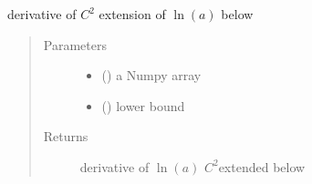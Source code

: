 \documentclass[letterpaper,10pt,english]{sphinxmanual}
\begin{document}
\begin{fulllineitems}
\label{\detokenize{ipfp_utils:ipfp_utils.der_nplog}}
derivative of \(C^2\) extension of  \(\ln(a)\) below 
\begin{quote}\begin{description}
\item[{Parameters}] \leavevmode\begin{itemize}
\item {} 
 () \textendash{} a Numpy array

\item {} 
 () \textendash{} lower bound

\end{itemize}

\item[{Returns}] \leavevmode
derivative of  \(\ln(a)\) \(C^2\)\sphinxhyphen{}extended below 

\end{description}\end{quote}

\end{fulllineitems}

\end{document}
